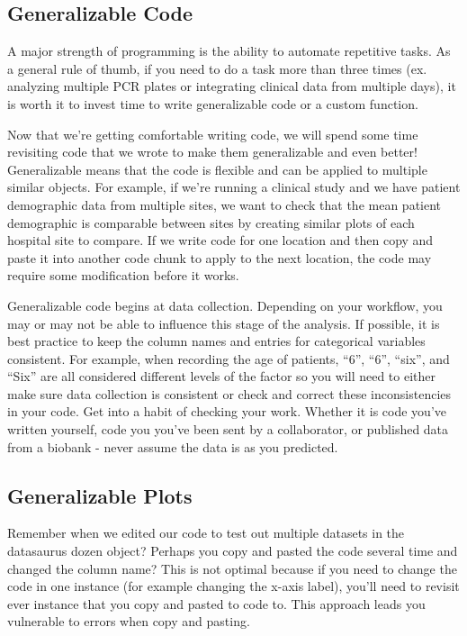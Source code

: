 \documentclass[
]{book}
\begin{document}
\subsection{Generalizable Code}\label{generalizable-code}

A major strength of programming is the ability to automate repetitive tasks. As a general rule of thumb, if you need to do a task more than three times (ex. analyzing multiple PCR plates or integrating clinical data from multiple days), it is worth it to invest time to write generalizable code or a custom function.

Now that we're getting comfortable writing code, we will spend some time revisiting code that we wrote to make them generalizable and even better! Generalizable means that the code is flexible and can be applied to multiple similar objects. For example, if we're running a clinical study and we have patient demographic data from multiple sites, we want to check that the mean patient demographic is comparable between sites by creating similar plots of each hospital site to compare. If we write code for one location and then copy and paste it into another code chunk to apply to the next location, the code may require some modification before it works.

Generalizable code begins at data collection. Depending on your workflow, you may or may not be able to influence this stage of the analysis. If possible, it is best practice to keep the column names and entries for categorical variables consistent. For example, when recording the age of patients, ``6'', ``6'', ``six'', and ``Six'' are all considered different levels of the factor so you will need to either make sure data collection is consistent or check and correct these inconsistencies in your code. Get into a habit of checking your work. Whether it is code you've written yourself, code you you've been sent by a collaborator, or published data from a biobank - never assume the data is as you predicted.

\subsection{Generalizable Plots}\label{generalizable-plots}

Remember when we edited our code to test out multiple datasets in the datasaurus dozen object? Perhaps you copy and pasted the code several time and changed the column name? This is not optimal because if you need to change the code in one instance (for example changing the x-axis label), you'll need to revisit ever instance that you copy and pasted to code to. This approach leads you vulnerable to errors when copy and pasting.
\end{document}
